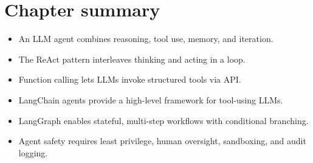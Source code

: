 \section{Chapter summary}

\begin{itemize}
  \item An LLM agent combines reasoning, tool use, memory, and iteration.
  \item The ReAct pattern interleaves thinking and acting in a loop.
  \item Function calling lets LLMs invoke structured tools via API.
  \item LangChain agents provide a high-level framework for tool-using LLMs.
  \item LangGraph enables stateful, multi-step workflows with conditional branching.
  \item Agent safety requires least privilege, human oversight, sandboxing, and audit logging.
\end{itemize}
